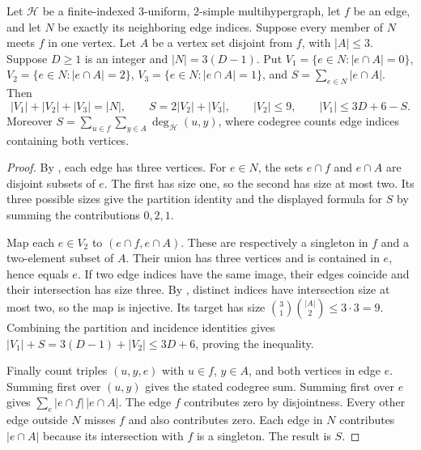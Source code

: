 \begin{lemma}
Let $\mathcal H$ be a finite-indexed $3$-uniform, $2$-simple
multihypergraph, let $f$ be an edge, and let $N$ be exactly its neighboring
edge indices. Suppose every member of $N$ meets $f$ in one vertex.
Let $A$ be a vertex set disjoint from $f$, with $|A|\le3$.
Suppose $D\ge1$ is an integer and $|N|=3(D-1)$.
Put $V_1=\{e\in N:|e\cap A|=0\}$,
$V_2=\{e\in N:|e\cap A|=2\}$,
$V_3=\{e\in N:|e\cap A|=1\}$, and
$S=\sum_{e\in N}|e\cap A|$. Then
\[
|V_1|+|V_2|+|V_3|=|N|,\qquad S=2|V_2|+|V_3|,
\qquad |V_2|\le9,\qquad |V_1|\le3D+6-S.
\]
Moreover $S=\sum_{u\in f}\sum_{y\in A}\deg_{\mathcal H}(u,y)$,
where codegree counts edge indices containing both vertices.
\end{lemma}
\begin{proof}
By , each edge has three vertices. For
$e\in N$, the sets $e\cap f$ and $e\cap A$ are disjoint subsets of $e$.
The first has size one, so the second has size at most two. Its three
possible sizes give the partition identity and the displayed formula for
$S$ by summing the contributions $0,2,1$.

Map each $e\in V_2$ to $(e\cap f,e\cap A)$. These are respectively a
singleton in $f$ and a two-element subset of $A$. Their union has three
vertices and is contained in $e$, hence equals $e$. If two edge indices
have the same image, their edges coincide and their intersection has
size three. By , distinct indices have
intersection size at most two, so the map is injective. Its target has
size $\binom31\binom{|A|}2\le3\cdot3=9$. Combining the partition and
incidence identities gives
$|V_1|+S=3(D-1)+|V_2|\le3D+6$, proving the inequality.

Finally count triples $(u,y,e)$ with $u\in f$, $y\in A$, and both
vertices in edge $e$. Summing first over $(u,y)$ gives the stated
codegree sum. Summing first over $e$ gives
$\sum_e |e\cap f|\,|e\cap A|$. The edge $f$ contributes zero by
disjointness. Every other edge outside $N$ misses $f$ and also contributes
zero. Each edge in $N$ contributes $|e\cap A|$ because its intersection
with $f$ is a singleton. The result is $S$.
\end{proof}
